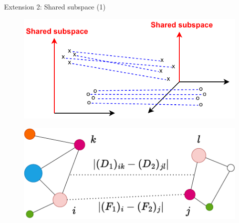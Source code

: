 \documentclass{beamer}
\begin{document}
\begin{frame}{Extension 2: Shared subspace (1)}
  \begin{figure}
    \centering
    \includegraphics[width=0.8\linewidth, keepaspectratio=true]{OT_new/fgw_abstract.pdf}
  \end{figure}

  \begin{figure}
    \centering
    \includegraphics[width=0.8\linewidth, keepaspectratio=true]{OT_new/fgw.pdf}
  \end{figure}

\end{frame}
\end{document}
